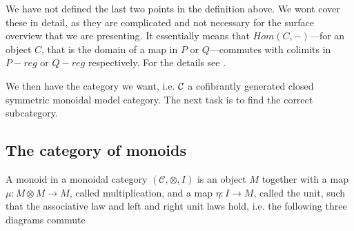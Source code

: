 We have not defined the last two points in the definition above. We wont cover these in detail, as they are complicated and not necessary for the surface overview that we are presenting. It essentially means that $Hom(C,-)$---for an object $C$, that is the domain of a map in $P$ or $Q$---commutes with colimits in $P-reg$ or $Q-reg$ respectively. For the details see \cite{monoid}. 

We then have the category we want, i.e. $\mathcal{C}$ a cofibrantly generated closed symmetric monoidal model category. The next task is to find the correct subcategory. 





\subsection*{The category of monoids}

\begin{definition}[Monoid]
A monoid in a monoidal category $ (\mathcal{C}, \otimes, I)$ is an object $ M$ together with a map $ \mu:M\otimes M\rightarrow M$, called multiplication, and a map $ \eta: I\rightarrow M$, called the unit, such that the associative law and left and right unit laws hold, i.e. the following three diagrams commute
\begin{center}
\end{center}

\begin{center}
\end{center}
\end{definition}

